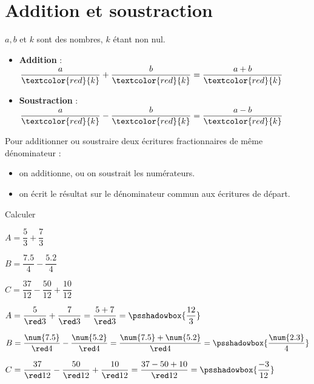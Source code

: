 \section{Addition et soustraction}

\begin{propriete}[\admise]
    $a, b$ et $k$ sont des nombres, $k$ étant non nul.
    \begin{itemize}
        \item \textcolor{B2}{\bf Addition} : $\dfrac{a}{\textcolor{red}{k}}+\dfrac{b}{\textcolor{red}{k}} = \dfrac{a+b}{\textcolor{red}{k}}$
        
        \smallskip
        \item \textcolor{B2}{\bf Soustraction} : $\dfrac{a}{\textcolor{red}{k}}-\dfrac{b}{\textcolor{red}{k}} = \dfrac{a-b}{\textcolor{red}{k}}$
    \end{itemize}
\end{propriete}


\begin{methode*1}
    Pour additionner ou soustraire deux écritures fractionnaires de même dénominateur :
    \begin{itemize}
        \item on additionne, ou on soustrait les numérateurs.
        \item on écrit le résultat sur le dénominateur commun aux écritures de départ.
    \end{itemize}
    \exercice
    Calculer
    \begin{list}{}{}
        \item $A=\dfrac{5}{3} + \dfrac{7}{3}$
        \item $B=\dfrac{\num{7.5}}{4} - \dfrac{\num{5.2}}{4}$
        \item $C=\dfrac{37}{12} - \dfrac{50}{12} + \dfrac{10}{12}$
    \end{list}
    \correction
    \begin{list}{}{}
        \item $A=\dfrac{5}{{\red 3}}  + \dfrac{7}{    {\red 3}} = \dfrac{5+7}{    {\red 3}} = \psshadowbox{\dfrac{12}{3}}$
        \item $B=\dfrac{\num{7.5}}{{\red 4}}  - \dfrac{\num{5.2}}{{\red 4}} = \dfrac{\num{7.5}+\num{5.2}}{{\red 4}} = \psshadowbox{\dfrac{\num{2.3}}{4}}$
        \item $C=\dfrac{37}{ {\red 12}} - \dfrac{50}{ {\red 12}} + \dfrac{10}{    {\red 12}} = \dfrac{37-50+10}{{\red 12}} = \psshadowbox{\dfrac{-3}{12}}$
    \end{list}
\end{methode*1}

